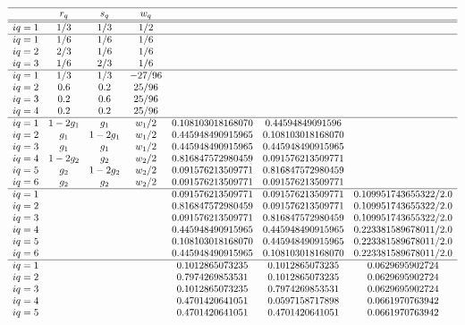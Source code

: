 {\small
\[
\begin{array}{ccccccc}
\hline
&r_q & s_q & w_q \\ 
\hline\hline
iq=1& 1/3 & 1/3 & 1/2\\
\hline
iq=1 & 1/6 & 1/6 & 1/6 \\
iq=2 & 2/3 & 1/6 & 1/6 \\
iq=3 & 1/6 & 2/3 & 1/6 \\
\hline
iq=1&1/3 & 1/3 & -27/96\\
iq=2&0.6 & 0.2 &  25/96\\
iq=3&0.2 & 0.6 &  25/96\\
iq=4&0.2 & 0.2 &  25/96\\
\hline
iq=1& 1-2g_1 & g_1 & w_1/2  &  0.108103018168070 & 0.44594849091596  &   \\
iq=2& g_1 & 1-2g_1 & w_1/2  &  0.445948490915965 & 0.108103018168070 &   \\
iq=3& g_1 & g_1    & w_1/2  &  0.445948490915965 & 0.445948490915965 &   \\
iq=4& 1-2g_2 & g_2 & w_2/2  &  0.816847572980459 & 0.091576213509771 &   \\
iq=5& g_2 & 1-2g_2 & w_2/2  &  0.091576213509771 & 0.816847572980459 &   \\
iq=6& g_2 & g_2    & w_2/2  &  0.091576213509771 & 0.091576213509771 &   \\
\hline
iq=1&&&&0.091576213509771 &  0.091576213509771    &    0.109951743655322/2.0 \\ 
iq=2&&&&0.816847572980459 &  0.091576213509771    &    0.109951743655322/2.0 \\
iq=3&&&&0.091576213509771 &  0.816847572980459    &    0.109951743655322/2.0 \\
iq=4&&&&0.445948490915965 &  0.445948490915965    &    0.223381589678011/2.0 \\
iq=5&&&&0.108103018168070 &  0.445948490915965    &    0.223381589678011/2.0 \\
iq=6&&&&0.445948490915965 &  0.108103018168070    &    0.223381589678011/2.0 \\
\hline
iq=1 &&&&0.1012865073235 &  0.1012865073235  &     0.0629695902724 \\
iq=2 &&&&0.7974269853531 &  0.1012865073235  &     0.0629695902724 \\
iq=3 &&&&0.1012865073235 &  0.7974269853531  &     0.0629695902724 \\
iq=4 &&&&0.4701420641051 &  0.0597158717898  &     0.0661970763942 \\
iq=5 &&&&0.4701420641051 &  0.4701420641051  &     0.0661970763942 \\

\end{array}\]}
